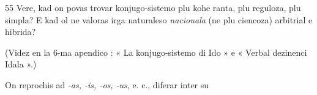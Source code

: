 \begin{VUpage}[59]{55}
\VUblancAlinea
Vere, kad on povas trovar konjugo-sistemo plu kohe\cc
ranta, plu reguloza, plu simpla? E kad ol ne valoras irga\nl
naturaleso \textit{nacionala} (ne plu ciencoza) arbitrial e hibrida?

(Videz en la 6-ma apendico : « La konjugo-sistemo di\nl
Ido » e « Verbal dezinenci Idala ».)

On reprochis ad \textit{-as, -is, -os, -us}, e. c., diferar inter su
\parplein
\end{VUpage}

